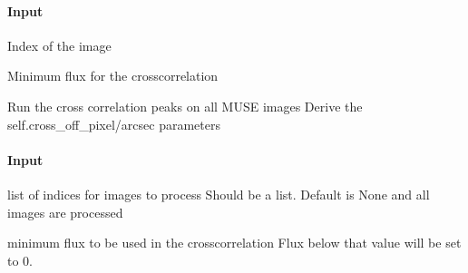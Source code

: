 \documentclass[letterpaper,10pt,english]{sphinxmanual}
\begin{document}
\begin{fulllineitems}
\begin{fulllineitems}
\paragraph{Input}
\label{\detokenize{api/pymusepipe:id4}}\begin{description}
\sphinxAtStartPar
Index of the image

\sphinxAtStartPar
Minimum flux for the cross\sphinxhyphen{}correlation

\end{description}

\end{fulllineitems}


\begin{fulllineitems}
\label{\detokenize{api/pymusepipe:pymusepipe.align_pipe.AlignMuseDataset.find_cross_peak_listima}}
\pysigstartsignatures
{}
\pysigstopsignatures
\sphinxAtStartPar
Run the cross correlation peaks on all MUSE images
Derive the self.cross\_off\_pixel/arcsec parameters


\paragraph{Input}
\label{\detokenize{api/pymusepipe:id5}}\begin{description}
\sphinxAtStartPar
list of indices for images to process Should be a list. Default is None
and all images are processed

\sphinxAtStartPar
minimum flux to be used in the cross\sphinxhyphen{}correlation
Flux below that value will be set to 0.

\end{description}

\end{fulllineitems}



\end{fulllineitems}
\end{document}
